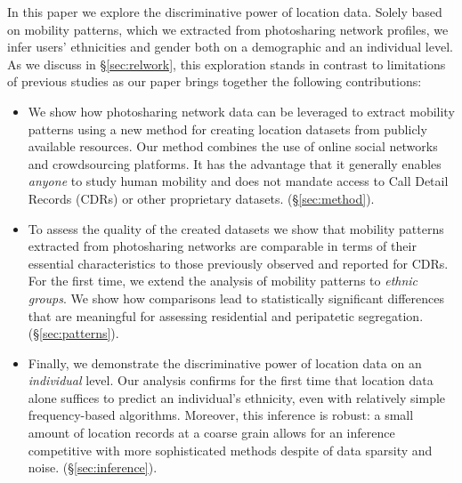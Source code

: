 In this paper we explore the discriminative power of location data. Solely based on mobility patterns, which we extracted from photosharing network profiles, we infer users' ethnicities and gender both on a demographic and an individual level. As we discuss in \S\ref{sec:relwork}, this exploration stands in contrast to limitations of previous studies as our paper brings together the following contributions:
\begin{itemize}
  \item We show how photosharing network data can be leveraged to extract mobility patterns using a new method for creating location datasets from publicly available resources. Our method combines the use of online social networks and crowdsourcing platforms. It has the advantage that it generally enables \emph{anyone} to study human mobility and does not mandate access to Call Detail Records (CDRs) or other proprietary datasets. (\S\ref{sec:method}).
  \item To assess the quality of the created datasets we show that mobility patterns extracted from photosharing networks are comparable in terms of their essential characteristics to those previously observed and reported for CDRs. For the first time, we extend the analysis of mobility patterns to \emph{ethnic groups}. We show how comparisons lead to statistically significant differences that are meaningful for assessing residential and peripatetic segregation. (\S\ref{sec:patterns}). 
  \item Finally, we demonstrate the discriminative power of location data on an \emph{individual} level. Our analysis confirms for the first time that location data alone suffices to predict an individual's ethnicity, even with relatively simple frequency-based algorithms. Moreover, this inference is robust: a small amount of location records at a coarse grain allows for an inference competitive with more sophisticated methods despite of data sparsity and noise. (\S\ref{sec:inference}).
\end{itemize}

